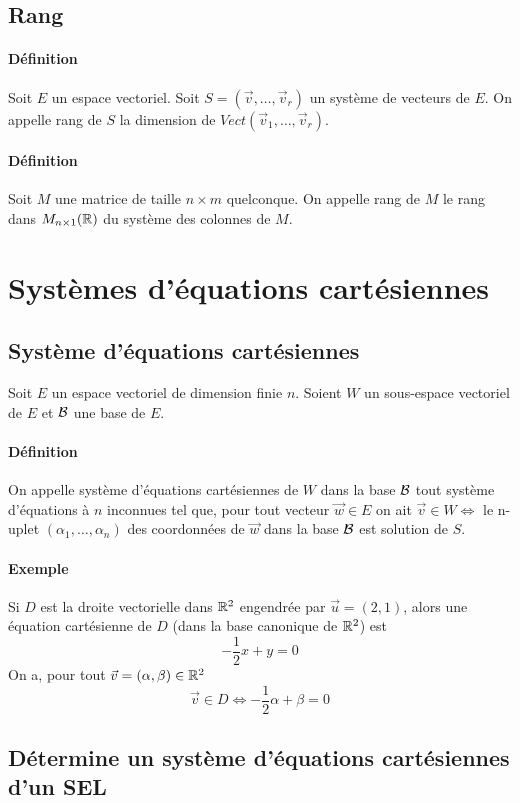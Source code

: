 %
\subsection{Rang}
%
\paragraph{Définition} Soit $E$ un espace vectoriel. Soit $S = (\vec{v}, \ldots, \vec{v}_r)$ un système de vecteurs de $E$. On appelle rang de $S$ la dimension de $Vect(\vec{v}_1, \ldots, \vec{v}_r)$.

\paragraph{Définition} Soit $M$ une matrice de taille $n\times m$ quelconque. On appelle rang de $M$ le rang dans $M_{n\times 1}(\mathbb{R})$ du système des colonnes de $M$.

%
%
\section{Systèmes d'équations cartésiennes} 
%
%

%
\subsection{Système d'équations cartésiennes}
%
Soit $E$ un espace vectoriel de dimension finie $n$. Soient $W$ un sous-espace vectoriel de $E$ et $\mathcal{B}$ une base de $E$.
\paragraph{Définition} On appelle système d'équations cartésiennes de $W$ dans la base $\mathcal{B}$ tout système d'équations à $n$ inconnues tel que, pour tout vecteur $\vec{w} \in E$ on ait $\vec{v} \in W \Leftrightarrow$ le n-uplet $(\alpha_1, \ldots, \alpha_n)$ des coordonnées de $\vec{w}$ dans la base $\mathcal{B}$ est solution de $S$.

\paragraph{Exemple} Si $D$ est la droite vectorielle dans $\mathbb{R}^2$ engendrée par $\vec{u} = (2, 1)$, alors une équation cartésienne de $D$ (dans la base canonique de $\mathbb{R}^2$) est
$$ - \frac{1}{2} x + y = 0$$
On a, pour tout $\vec{v} = (\alpha, \beta) \in \mathbb{R}^2$ 
$$\vec{v} \in D \Leftrightarrow -\frac{1}{2} \alpha + \beta = 0$$

%
\subsection{Détermine un système d'équations cartésiennes d'un SEL}
%
